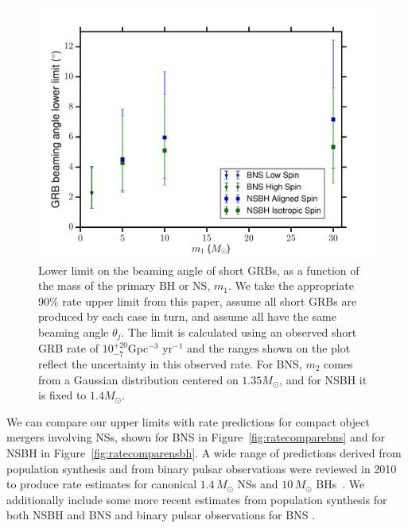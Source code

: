 \begin{figure}[t]
\centering
\includegraphics[width=\textwidth]{figs/chapter3/figure8.pdf}
\caption{\label{fig:beaming} Lower limit on the beaming angle of short
\acp{GRB}, as a function of the mass of the primary BH or
NS, $m_1$. We take the appropriate  90\% rate upper limit from this paper,
assume all short \acp{GRB} are produced by each case in turn, and assume all
have the same beaming angle $\theta_j$. The limit is calculated using an
observed short \ac{GRB} rate of
$10^{+20}_{-7}$Gpc$^{-3}$ yr$^{-1}$
and the ranges shown on the plot reflect the uncertainty in this observed rate.
For \ac{BNS}, $m_2$ comes from a Gaussian distribution centered on $1.35M_\odot$, and
for \ac{NSBH} it is fixed to $1.4M_\odot$.}
\end{figure}

We can compare our upper limits with rate predictions for compact object mergers
involving \acp{NS}, shown for \ac{BNS} in Figure~\ref{fig:ratecomparebns} and for \ac{NSBH} in
Figure~\ref{fig:ratecomparensbh}. A wide range of predictions derived from population
synthesis and from binary pulsar observations were reviewed in 2010 to produce rate estimates
for canonical
$1.4\,{{M_{\odot}}}$ \acp{NS} and $10\,{{M_{\odot}}}$ \acp{BH}~\citep{Abadie:2010cf}. We
additionally include some more recent estimates from population synthesis for
both \ac{NSBH} and \ac{BNS} \citep{Dominik:2014yma,Belczynski:2015tba,deMink:2015yea} and
binary pulsar observations for \ac{BNS} \citep{Kim:2013tca}.

